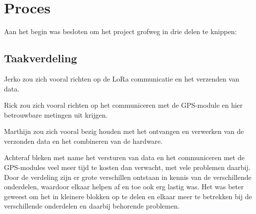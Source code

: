 \section{Proces}
Aan het begin was besloten om het project grofweg in drie delen te knippen:

\subsection{Taakverdeling}
Jerko zou zich vooral richten op de LoRa communicatie en het verzenden van data.

Rick zou zich vooral richten op het communiceren met de GPS-module en hier
betrouwbare metingen uit krijgen.

Marthijn zou zich vooral bezig houden met het ontvangen en verwerken van de
verzonden data en het combineren van de hardware.

Achteraf bleken met name het versturen van data en het communiceren met de
GPS-modules veel meer tijd te kosten dan verwacht, met vele problemen daarbij.
Door de verdeling zijn er grote verschillen ontstaan in kennis van de
verschillende onderdelen, waardoor elkaar helpen af en toe ook erg lastig was.
Het was beter geweest om het in kleinere blokken op te delen en elkaar meer te
betrekken bij de verschillende onderdelen en daarbij behorende problemen.
